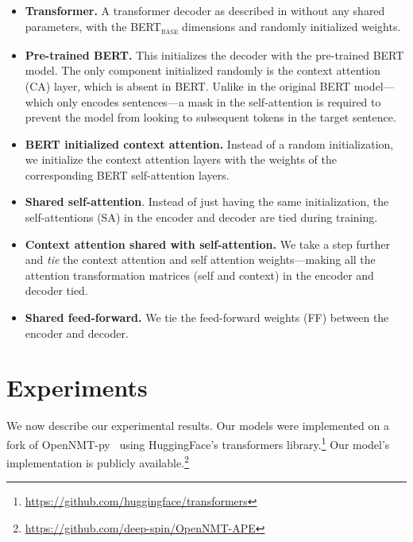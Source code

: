 \begin{itemize}
    \item \textbf{Transformer.} A transformer decoder as described in
          \citet{vaswani2017attention} without any shared parameters,
          with the BERT\textsubscript{\textsc{base}} dimensions and randomly
          initialized weights.
    \item \textbf{Pre-trained BERT.} This initializes the decoder with
          the pre-trained BERT model. The only component initialized randomly
          is the context attention (CA) layer, which is absent in BERT. Unlike
          in the original BERT model---which only encodes sentences---a mask in
          the self-attention is required to prevent the model from looking to
          subsequent tokens in the target sentence.
    \item \textbf{ BERT initialized context attention.} Instead of a
          random initialization, we initialize the context attention layers
          with the weights of the corresponding BERT self-attention layers.
    \item \textbf{Shared self-attention}. Instead of just having the same
          initialization, the self-attentions (SA) in the encoder and decoder
          are tied during training.
    \item \textbf{Context attention shared with self-attention.} We take
          a step further and \emph{tie} the context attention and self
          attention weights---making all the attention transformation matrices
          (self and context) in the encoder and decoder tied.
    \item \textbf{Shared feed-forward.} We tie the feed-forward weights
          (FF) between the encoder and decoder.
\end{itemize}

\section{Experiments} \label{sec:experiments}

We now describe our experimental results. Our models were implemented
on a fork of OpenNMT-py~\citep{klein2017opennmt} using HuggingFace's
transformers
library.\footnote{\url{https://github.com/huggingface/transformers}}
Our model's implementation is publicly
available.\footnote{\url{https://github.com/deep-spin/OpenNMT-APE}}

